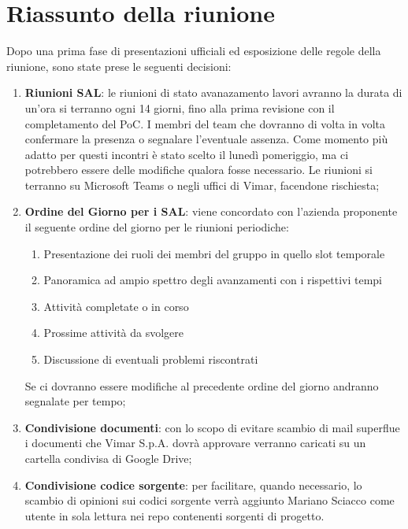 \section{Riassunto della riunione}
Dopo una prima fase di presentazioni ufficiali ed esposizione delle regole della riunione, sono state prese le seguenti decisioni:
\begin{enumerate}
    \item \textbf{Riunioni SAL}: le riunioni di stato avanazamento lavori avranno la durata di un'ora si terranno ogni 14 giorni, fino alla prima revisione con il completamento del PoC. I membri del team che dovranno di volta in volta confermare la presenza o segnalare l'eventuale assenza. Come momento più adatto per questi incontri è stato scelto il lunedì pomeriggio, ma ci potrebbero essere delle modifiche qualora fosse necessario. Le riunioni si terranno su Microsoft Teams o negli uffici di Vimar, facendone rischiesta;
    
    \item \textbf{Ordine del Giorno per i SAL}: viene concordato con l'azienda proponente il seguente ordine del giorno per le riunioni periodiche:
        \begin{enumerate}[label=\Roman* - ]
            \item Presentazione dei ruoli dei membri del gruppo in quello slot temporale
            \item Panoramica ad ampio spettro degli avanzamenti con i rispettivi tempi
            \item Attività completate o in corso 
            \item Prossime attività da svolgere
            \item Discussione di eventuali problemi riscontrati
        \end{enumerate}
    Se ci dovranno essere modifiche al precedente ordine del giorno andranno segnalate per tempo;

    \item \textbf{Condivisione documenti}: con lo scopo di evitare scambio di mail superflue i documenti che Vimar S.p.A. dovrà approvare verranno caricati su un cartella condivisa di Google Drive;

    \item \textbf{Condivisione codice sorgente}: per facilitare, quando necessario, lo scambio di opinioni sui codici sorgente verrà aggiunto Mariano Sciacco come utente in sola lettura nei repo contenenti sorgenti di progetto.

\end{enumerate}

